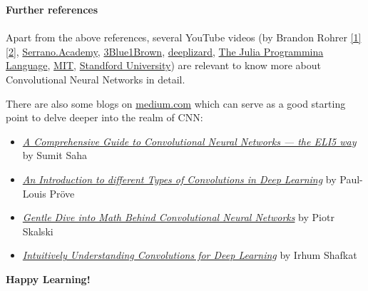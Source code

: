 \documentclass[a4paper,12pt]{book} %
\begin{document}
\titleformat{\section}[block]
{\normalfont\large\bfseries}{\thesection}{1em}{}

\titleformat{\subsection}[block]{\normalfont\normalsize\bfseries}{\thesubsection}{1em}{}

\newpage
\tableofcontents
\newpage







\textbf{Further references}\\\\
Apart from the above references, several YouTube videos (by Brandon Rohrer \href{https://www.youtube.com/watch?v=JB8T_zN7ZC0}{[1]} \href{https://www.youtube.com/watch?v=FmpDIaiMIeA}{[2]}, \href{https://www.youtube.com/watch?v=2-Ol7ZB0MmU}{Serrano.Academy}, \href{https://www.youtube.com/watch?v=KuXjwB4LzSA}{3Blue1Brown}, \href{https://www.youtube.com/watch?v=YRhxdVk_sIs}{deeplizard}, \href{https://www.youtube.com/watch?v=8rrHTtUzyZA}{The Julia Programmina Language}, \href{https://www.youtube.com/watch?v=2xqkSUhmmXU}{MIT}, \href{https://www.youtube.com/playlist?list=PL3FW7Lu3i5JvHM8ljYj-zLfQRF3EO8sYv}{Standford University}) are relevant to know more about Convolutional Neural Networks in detail.

There are also some blogs on \url{medium.com} which can serve as a good starting point to delve deeper into the realm of CNN:
\begin{itemize}
    \item \href{https://towardsdatascience.com/a-comprehensive-guide-to-convolutional-neural-networks-the-eli5-way-3bd2b1164a53}{\textit{A Comprehensive Guide to Convolutional Neural Networks — the ELI5 way}} by Sumit Saha
    \item \href{https://towardsdatascience.com/types-of-convolutions-in-deep-learning-717013397f4d}{\textit{An Introduction to different Types of Convolutions in Deep Learning}} by Paul-Louis Pröve
    \item \href{https://towardsdatascience.com/gentle-dive-into-math-behind-convolutional-neural-networks-79a07dd44cf9}{\textit{Gentle Dive into Math Behind Convolutional Neural Networks}} by Piotr Skalski
    \item \href{https://towardsdatascience.com/intuitively-understanding-convolutions-for-deep-learning-1f6f42faee1}{\textit{Intuitively Understanding Convolutions for Deep Learning}} by Irhum Shafkat
\end{itemize}

\setlength{\parskip}{5em} \textbf{Happy Learning!}
\end{document}
